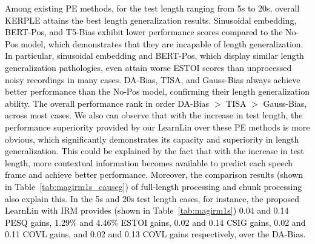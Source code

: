 \documentclass[journal]{IEEEtran}
\begin{document}
\textcolor{black}{Among existing PE methods, for the test length ranging from 5s to 20s, overall KERPLE attains the best length generalization results. Sinusoidal embedding, BERT-Pos, and T5-Bias exhibit lower performance scores compared to the No-Pos model, which demonstrates that they are incapable of length generalization. In particular, sinusoidal embedding and BERT-Pos, which display similar length generalization pathologies, even attain worse ESTOI scores than unprocessed noisy recordings in many cases. DA-Bias, TISA, and Gauss-Bias always achieve better performance than the No-Pos model, confirming their length generalization ability. The overall performance rank in order DA-Bias $>$ TISA $>$ Gauss-Bias, across most cases. \textcolor{black}{We also can observe that with the increase in test length, the performance superiority provided by our LearnLin over these PE methods is more obvious, which significantly demonstrates its capacity and superiority in length generalization. \textcolor{black}{This could be explained by the fact that with the increase in test length, more contextual information becomes available to predict each speech frame and achieve better performance. Moreover, the comparison results (shown in Table~\ref{tab:magirm1s_causeg}) of full-length processing and chunk processing also explain this.}} In the 5s and 20s test length cases, for instance, the proposed LearnLin with IRM provides (shown in Table~\ref{tab:magirm1s}) 0.04 and 0.14 PESQ gains, 1.29\% and 4.46\% ESTOI gains, 0.02 and 0.14 CSIG gains, 0.02 and 0.11 COVL gains, and 0.02 and 0.13 COVL gains respectively, over the DA-Bias.
}




\end{document}
